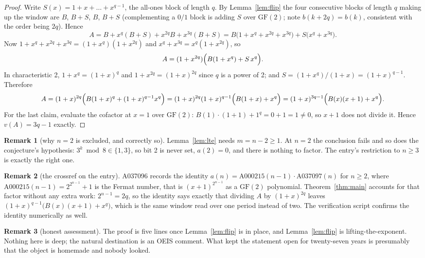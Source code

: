 \documentclass[11pt,a4paper]{article}
\theoremstyle{plain}
\theoremstyle{definition}
\newtheorem*{remark}{Remark}
\begin{document}
\begin{proof}
Write $S(x)=1+x+\dots+x^{q-1}$, the all-ones block of length $q$. By
Lemma~\ref{lem:flip} the four consecutive blocks of length $q$ making up the window are
$B$, $B+S$, $B$, $B+S$ (complementing a $0/1$ block is adding $S$ over $\mathrm{GF}(2)$;
note $b(k+2q)=b(k)$, consistent with the order being $2q$). Hence
\[
  A=B+x^{q}(B+S)+x^{2q}B+x^{3q}(B+S)
   =B\bigl(1+x^{q}+x^{2q}+x^{3q}\bigr)+S\bigl(x^{q}+x^{3q}\bigr).
\]
Now $1+x^{q}+x^{2q}+x^{3q}=(1+x^{q})(1+x^{2q})$ and $x^{q}+x^{3q}=x^{q}(1+x^{2q})$, so
\[
  A=(1+x^{2q})\Bigl(B(1+x^{q})+S\,x^{q}\Bigr).
\]
In characteristic 2, $1+x^{q}=(1+x)^{q}$ and $1+x^{2q}=(1+x)^{2q}$ since $q$ is a power of
2; and $S=(1+x^{q})/(1+x)=(1+x)^{q-1}$. Therefore
\[
  A=(1+x)^{2q}\Bigl(B(1+x)^{q}+(1+x)^{q-1}x^{q}\Bigr)
   =(1+x)^{2q}(1+x)^{q-1}\Bigl(B(1+x)+x^{q}\Bigr)
   =(1+x)^{3q-1}\Bigl(B(x)(x+1)+x^{q}\Bigr).
\]
For the last claim, evaluate the cofactor at $x=1$ over $\mathrm{GF}(2)$:
$B(1)\cdot(1+1)+1^{q}=0+1=1\ne0$, so $x+1$ does not divide it. Hence $v(A)=3q-1$ exactly.
\end{proof}

\begin{remark}[why $n=2$ is excluded, and correctly so]
Lemma~\ref{lem:lte} needs $m=n-2\ge1$. At $n=2$ the conclusion fails and so does the
conjecture's hypothesis: $3^{k}\bmod8\in\{1,3\}$, so bit 2 is never set, $a(2)=0$, and
there is nothing to factor. The entry's restriction to $n\ge3$ is exactly the right one.
\end{remark}

\begin{remark}[the crossref on the entry]
A037096 records the identity $a(n)=\mathrm{A000215}(n-1)\cdot\mathrm{A037097}(n)$ for
$n\ge2$, where $\mathrm{A000215}(n-1)=2^{2^{n-1}}+1$ is the Fermat number, that is
$(x+1)^{2^{n-1}}$ as a $\mathrm{GF}(2)$ polynomial. Theorem~\ref{thm:main} accounts for
that factor without any extra work: $2^{n-1}=2q$, so the identity says exactly that
dividing $A$ by $(1+x)^{2q}$ leaves $(1+x)^{q-1}\bigl(B(x)(x+1)+x^{q}\bigr)$, which is the
same window read over one period instead of two. The verification script confirms the
identity numerically as well.
\end{remark}

\begin{remark}[honest assessment]
The proof is five lines once Lemma~\ref{lem:flip} is in place, and Lemma~\ref{lem:flip} is
lifting-the-exponent. Nothing here is deep; the natural destination is an OEIS comment.
What kept the statement open for twenty-seven years is presumably that the object is
homemade and nobody looked.
\end{remark}
\end{document}
